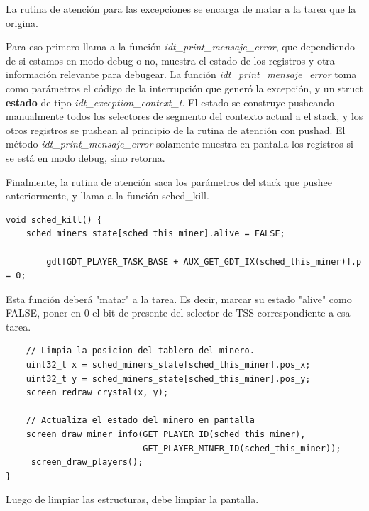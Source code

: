 \documentclass[a4paper]{article}
\newenvironment{codesnippet}{%
	\begin{Sbox}\begin{minipage}{\textwidth}\sffamily\small}%
	{\end{minipage}\end{Sbox}%
		\begin{center}%
		\vspace{-0.4cm}\colorbox{litegrey}{\TheSbox}\end{center}\vspace{0.3cm}}
\begin{document}
La rutina de atención para las excepciones se encarga de matar a la tarea que la origina.

Para eso primero llama a la función \textit{idt_print_mensaje_error}, que dependiendo de si estamos en modo debug o no,
muestra el estado de los registros y otra información relevante para debugear. La función
\textit{idt_print_mensaje_error} toma como parámetros el código de la interrupción que generó la excepción, y un struct
\textbf{estado} de tipo \textit{idt_exception_context_t}. El estado se construye pusheando manualmente todos los
selectores de segmento del contexto actual a el stack, y los otros registros se pushean al principio de la rutina de
atención con pushad. El método \textit{idt_print_mensaje_error} solamente muestra en pantalla los registros si se está
en modo debug, sino retorna.

Finalmente, la rutina de atención saca los parámetros del stack                                            que pushee
anteriormente, y llama a la función sched_kill.

\begin{codesnippet}
  \begin{verbatim}
void sched_kill() {
    sched_miners_state[sched_this_miner].alive = FALSE;
    
        gdt[GDT_PLAYER_TASK_BASE + AUX_GET_GDT_IX(sched_this_miner)].p = 0;
     \end{verbatim}
\end{codesnippet}

Esta función deberá  "matar" a la tarea. Es decir, marcar su estado "alive" como FALSE, poner en 0 el bit de presente
del selector de TSS correspondiente a esa tarea. 

\begin{codesnippet}
  \begin{verbatim}
    // Limpia la posicion del tablero del minero.
    uint32_t x = sched_miners_state[sched_this_miner].pos_x;
    uint32_t y = sched_miners_state[sched_this_miner].pos_y;
    screen_redraw_crystal(x, y);

    // Actualiza el estado del minero en pantalla
    screen_draw_miner_info(GET_PLAYER_ID(sched_this_miner),
                           GET_PLAYER_MINER_ID(sched_this_miner));
	 screen_draw_players();
}
     \end{verbatim}
\end{codesnippet}

Luego de limpiar las  estructuras, debe limpiar la pantalla.
\end{document}
